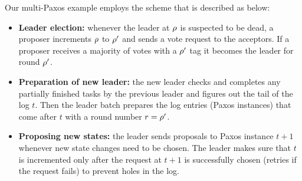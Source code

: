 Our multi-Paxos example employs the scheme that is described as below:
\begin{itemize}[leftmargin=*]
	\item {\textbf{Leader election: }} whenever the leader at $\rho$ is
		suspected to be dead, a proposer increments $\rho$ to $\rho'$ and
		sends a vote request to the acceptors.
		If a proposer receives a majority of votes with a $\rho'$ tag it
		becomes the leader for round $\rho'$.
	\item {\textbf{Preparation of new leader: }} the new leader checks and completes any
		partially finished tasks by the previous leader and figures out the
		tail of the log $t$. Then the leader batch prepares the log entries
		(Paxos instances) that come after $t$ with a round number $r = \rho'$.
	\item {\textbf{Proposing new states: }} the leader sends proposals
		to Paxos instance $t+1$ whenever new state changes need to be chosen.
		The leader makes sure that $t$ is incremented only after the
		request at $t+1$ is successfully chosen (retries if the
		request fails) to prevent holes in the log.
\end{itemize}


%
%
%


